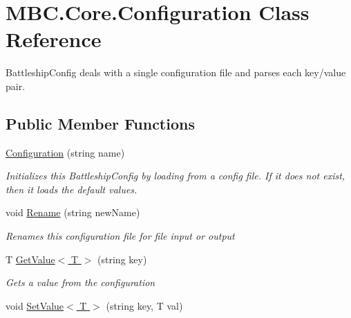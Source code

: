 \hypertarget{class_m_b_c_1_1_core_1_1_configuration}{\section{M\-B\-C.\-Core.\-Configuration Class Reference}
\label{class_m_b_c_1_1_core_1_1_configuration}
}


Battleship\-Config deals with a single configuration file and parses each key/value pair.  


\subsection*{Public Member Functions}
\begin{DoxyCompactItemize}
\item 
\hypertarget{class_m_b_c_1_1_core_1_1_configuration_aa0551a9f6fc9d76aa2300da55f6ea135}{\hyperlink{class_m_b_c_1_1_core_1_1_configuration_aa0551a9f6fc9d76aa2300da55f6ea135}{Configuration} (string name)}\label{class_m_b_c_1_1_core_1_1_configuration_aa0551a9f6fc9d76aa2300da55f6ea135}

\begin{DoxyCompactList}\small\item\em Initializes this Battleship\-Config by loading from a config file. If it does not exist, then it loads the default values.\end{DoxyCompactList}\item 
\hypertarget{class_m_b_c_1_1_core_1_1_configuration_a7fd9b75ad6dcea3175cd25e4afe9f59e}{void \hyperlink{class_m_b_c_1_1_core_1_1_configuration_a7fd9b75ad6dcea3175cd25e4afe9f59e}{Rename} (string new\-Name)}\label{class_m_b_c_1_1_core_1_1_configuration_a7fd9b75ad6dcea3175cd25e4afe9f59e}

\begin{DoxyCompactList}\small\item\em Renames this configuration file for file input or output\end{DoxyCompactList}\item 
T \hyperlink{class_m_b_c_1_1_core_1_1_configuration_a99eca01ad59c2249e973ac180954cbe1}{Get\-Value$<$ T $>$} (string key)
\begin{DoxyCompactList}\small\item\em Gets a value from the configuration\end{DoxyCompactList}\item 
\hypertarget{class_m_b_c_1_1_core_1_1_configuration_ac93df5e6e6f3a6cb075a587907ec6ce3}{void \hyperlink{class_m_b_c_1_1_core_1_1_configuration_ac93df5e6e6f3a6cb075a587907ec6ce3}{Set\-Value$<$ T $>$} (string key, T val)}\label{class_m_b_c_1_1_core_1_1_configuration_ac93df5e6e6f3a6cb075a587907ec6ce3}


\end{DoxyCompactItemize}

